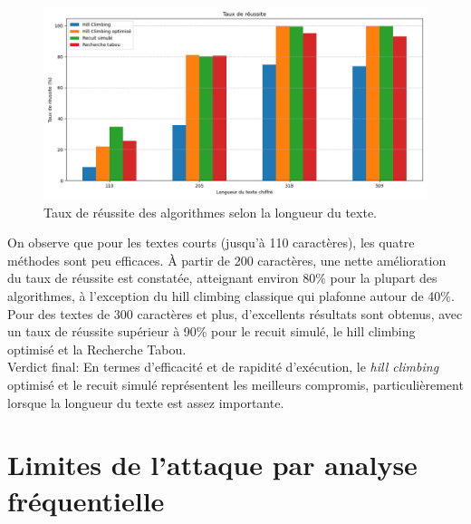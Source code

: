 \documentclass[a4paper]{article}
\begin{document}
\begin{figure}[H]
    \centering
    \includegraphics[width=\textwidth, keepaspectratio, height=\textheight]{taux_reussite.png}
    \caption{Taux de réussite des algorithmes selon la longueur du texte.}
    \label{fig:tous-reussite}
\end{figure}

On observe que pour les textes courts (jusqu'à 110 caractères), les quatre méthodes sont peu efficaces. À partir de 200 caractères, une nette amélioration du taux de réussite est constatée, atteignant environ 80\% pour la plupart des algorithmes, à l'exception du hill climbing classique qui plafonne autour de 40\%. Pour des textes de 300 caractères et plus, d'excellents résultats sont obtenus, 
avec un taux de réussite supérieur à 90\% pour le recuit simulé, le hill climbing optimisé et la Recherche Tabou.\\
Verdict final: En termes d'efficacité et de rapidité d'exécution, le \textit{hill climbing} optimisé et le recuit simulé représentent les meilleurs compromis, particulièrement lorsque la longueur du texte est assez importante.


\section{Limites de l'attaque par analyse fréquentielle}
\end{document}
